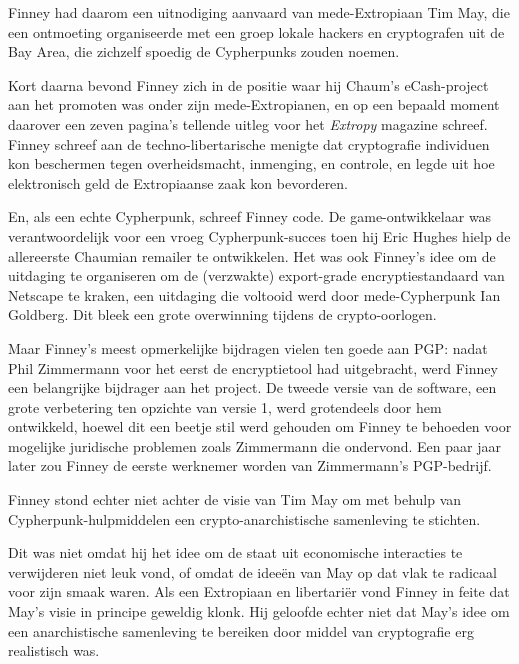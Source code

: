 \documentclass[smalldemyvopaper,11pt,twoside,onecolumn,openright,extrafontsizes,hidelinks]{memoir}
\begin{document}
Finney had daarom een uitnodiging aanvaard van mede-Extropiaan Tim May,
die een ontmoeting organiseerde met een groep lokale hackers en
cryptografen uit de Bay Area, die zichzelf spoedig de Cypherpunks zouden
noemen.

Kort daarna bevond Finney zich in de positie waar hij Chaum's
eCash-project aan het promoten was onder zijn mede-Extropianen, en op
een bepaald moment daarover een zeven pagina's tellende uitleg voor het
\emph{Extropy} magazine schreef. Finney schreef aan de
techno-libertarische menigte dat cryptografie individuen kon beschermen
tegen overheidsmacht, inmenging, en controle, en legde uit hoe
elektronisch geld de Extropiaanse zaak kon bevorderen.

En, als een echte Cypherpunk, schreef Finney code. De game-ontwikkelaar
was verantwoordelijk voor een vroeg Cypherpunk-succes toen hij Eric
Hughes hielp de allereerste Chaumian remailer te ontwikkelen. Het was
ook Finney's idee om de uitdaging te organiseren om de (verzwakte)
export-grade encryptiestandaard van Netscape te kraken, een uitdaging
die voltooid werd door mede-Cypherpunk Ian Goldberg. Dit bleek een grote
overwinning tijdens de crypto-oorlogen.

Maar Finney's meest opmerkelijke bijdragen vielen ten goede aan PGP:
nadat Phil Zimmermann voor het eerst de encryptietool had uitgebracht,
werd Finney een belangrijke bijdrager aan het project. De tweede versie
van de software, een grote verbetering ten opzichte van versie 1, werd
grotendeels door hem ontwikkeld, hoewel dit een beetje stil werd
gehouden om Finney te behoeden voor mogelijke juridische problemen zoals
Zimmermann die ondervond. Een paar jaar later zou Finney de eerste
werknemer worden van Zimmermann's PGP-bedrijf.

Finney stond echter niet achter de visie van Tim May om met behulp van
Cypherpunk-hulpmiddelen een crypto-anarchistische samenleving te
stichten.

Dit was niet omdat hij het idee om de staat uit economische interacties
te verwijderen niet leuk vond, of omdat de ideeën van May op dat vlak te
radicaal voor zijn smaak waren. Als een Extropiaan en libertariër vond
Finney in feite dat May's visie in principe geweldig klonk. Hij geloofde
echter niet dat May's idee om een anarchistische samenleving te bereiken
door middel van cryptografie erg realistisch was.
\end{document}
